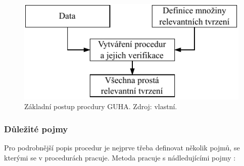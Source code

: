 \begin{figure}[hbtp!]
    \centering
    \captionsetup{justification=centering}
    \includegraphics[width=.5\textwidth]{obrazky/GUHA/GUHA2.pdf}
    \caption{Základní postup procdury GUHA. Zdroj: vlastní.}
    \label{obr:met:GUHA2}
\end{figure}

\subsubsection{Důležité pojmy}



Pro podrobnější popis procedur je nejprve třeba definovat několik pojmů, se kterými se v procedurách pracuje. Metoda pracuje s nádledujícími pojmy \cite{bib:GUHA}:

